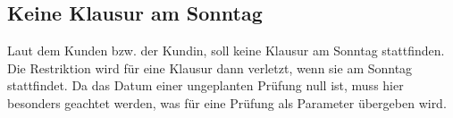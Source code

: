 \subsection{Keine Klausur am Sonntag}
Laut dem Kunden bzw. der Kundin, soll keine Klausur am Sonntag stattfinden.
Die Restriktion wird für eine Klausur dann verletzt, wenn sie am Sonntag stattfindet.
Da das Datum einer ungeplanten Prüfung null ist, muss hier besonders geachtet werden, was für
eine Prüfung als Parameter übergeben wird.